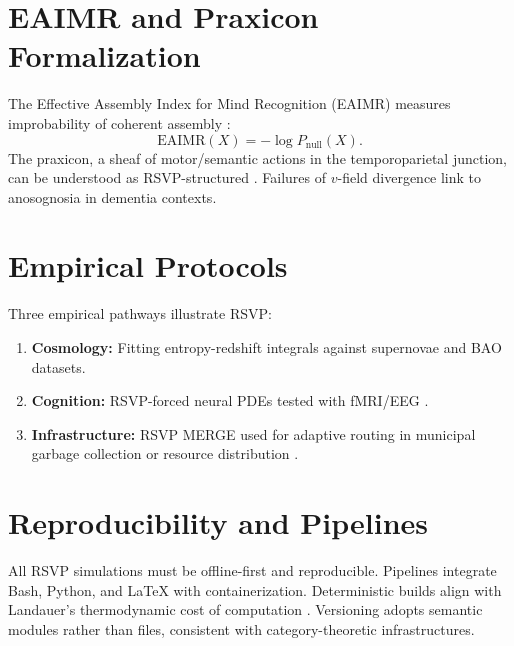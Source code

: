 \section{EAIMR and Praxicon Formalization}
The Effective Assembly Index for Mind Recognition (EAIMR) measures improbability of coherent assembly \cite{Levin2022}:
\[
\mathrm{EAIMR}(X)=-\log P_{\text{null}}(X).
\]
The praxicon, a sheaf of motor/semantic actions in the temporoparietal junction, can be understood as RSVP-structured \cite{Deco:2008zz,Oizumi2014,Seth2016}. Failures of $v$-field divergence link to anosognosia in dementia contexts.

\section{Empirical Protocols}
Three empirical pathways illustrate RSVP:
\begin{enumerate}
    \item \textbf{Cosmology:} Fitting entropy-redshift integrals \cite{Jacobson:1995ab,Verlinde:2010hp,Padmanabhan:2009vy,Carney2022} against supernovae and BAO datasets.
    \item \textbf{Cognition:} RSVP-forced neural PDEs tested with fMRI/EEG \cite{Amari1977,Wilson:1972wza,Deco:2008zz}.
    \item \textbf{Infrastructure:} RSVP MERGE used for adaptive routing in municipal garbage collection or resource distribution \cite{Wiener1948,Ashby1956}.
\end{enumerate}

\section{Reproducibility and Pipelines}
All RSVP simulations must be offline-first and reproducible. Pipelines integrate Bash, Python, and LaTeX with containerization. Deterministic builds align with Landauer’s thermodynamic cost of computation \cite{Landauer1961,Bennett1982}. Versioning adopts semantic modules rather than files, consistent with category-theoretic infrastructures.

